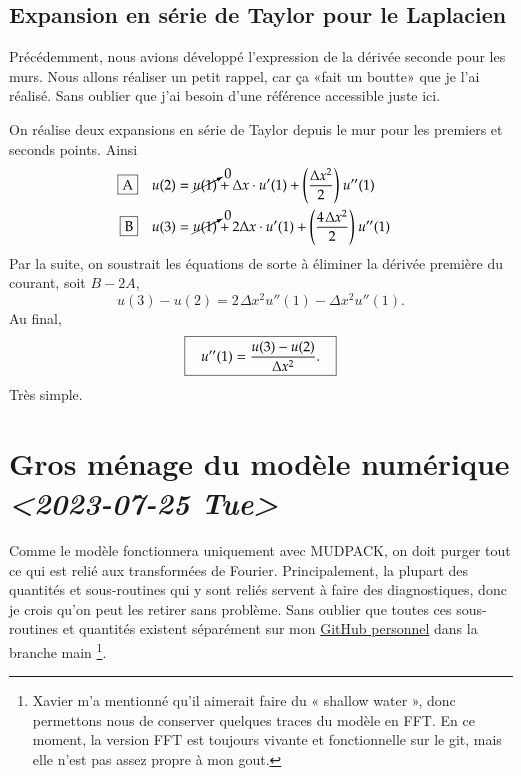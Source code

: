 \documentclass[10pt]{article}
\numberwithin{equation}{section}
\newcommand{\pt}{\hspace{1pt}}
\begin{document}
\subsection{Expansion en série de Taylor pour le Laplacien}
\label{sec:orgbb97765}
Précédemment, nous avions développé l'expression de la dérivée seconde pour les murs.
Nous allons réaliser un petit rappel, car ça «\pt fait un boutte\pt» que je l'ai réalisé.
Sans oublier que j'ai besoin d'une référence accessible juste ici.\bigskip

On réalise deux expansions en série de Taylor depuis le mur pour les premiers et seconds points.
Ainsi
\begin{align}
   &&\boxed{\text{A}} && &u(2) = \cancelto{0}{u(1)} + \Delta x \cdot u'(1) + \qty(\frac{\Delta x^2}{2}) \ u''(1) && &&\\
   &&\boxed{\text{B}} && &u(3) = \cancelto{0}{u(1)} + 2\Delta x \cdot u'(1) + \qty(\frac{4\pt \Delta x^2}{2}) \ u''(1) && &&
\end{align}
Par la suite, on soustrait les équations de sorte à éliminer la dérivée première du courant, soit \(B - 2A\),
\begin{equation}
   u(3) - u(2) = 2\pt \Delta x^2 u''(1) - \Delta x^2 u''(1).
\end{equation}
Au final,
\begin{equation}
   \boxed{\hspace{0.3cm} u''(1) = \frac{u(3)-u(2)}{\Delta x^2}.\hspace{0.3cm}}
\end{equation}
Très simple.

\section{Gros ménage du modèle numérique \textit{<2023-07-25 Tue>}}
\label{sec:orgde657ad}
Comme le modèle fonctionnera uniquement avec MUDPACK, on doit purger tout ce qui est relié aux transformées de Fourier.
Principalement, la plupart des quantités et sous-routines qui y sont reliés servent à faire des diagnostiques, donc je crois qu'on peut les retirer sans problème.
Sans oublier que toutes ces sous-routines et quantités existent séparément sur mon \href{https://github.com/charli1213/Modele-shallow-water-multicouches}{GitHub personnel} dans la branche main \footnote{Xavier m'a mentionné qu'il aimerait faire du « shallow water », donc permettons nous de conserver quelques traces du modèle en FFT. En ce moment, la version FFT est toujours vivante et fonctionnelle sur le git, mais elle n'est pas assez propre à mon gout.}.
\end{document}
